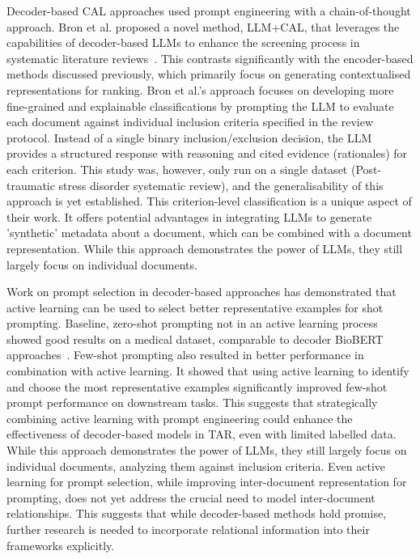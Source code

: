 \documentclass[10pt, english]{article}
\begin{document}
Decoder-based CAL approaches used prompt engineering with a chain-of-thought approach. Bron et al. proposed a novel method, LLM+CAL, that leverages the capabilities of decoder-based LLMs to enhance the screening process in systematic literature reviews~\cite{bron_combining_2024}. This contrasts significantly with the encoder-based methods discussed previously, which primarily focus on generating contextualised representations for ranking. Bron et al.'s approach focuses on developing more fine-grained and explainable classifications by prompting the LLM to evaluate each document against individual inclusion criteria specified in the review protocol. Instead of a single binary inclusion/exclusion decision, the LLM provides a structured response with reasoning and cited evidence (rationales) for each criterion. This study was, however, only run on a single dataset (Post-traumatic stress disorder systematic review), and the generalisability of this approach is yet established. This criterion-level classification is a unique aspect of their work. It offers potential advantages in integrating LLMs to generate 'synthetic' metadata about a document, which can be combined with a document representation. While this approach demonstrates the power of LLMs, they still largely focus on individual documents.

Work on prompt selection in decoder-based approaches has demonstrated that active learning can be used to select better representative examples for shot prompting.  Baseline, zero-shot prompting not in an active learning process showed good results on a medical dataset, comparable to decoder BioBERT approaches~\cite{wang_zero-shot_2024}. Few-shot prompting also resulted in better performance \cite{margatina_importance_2022} in combination with active learning. It showed that using active learning to identify and choose the most representative examples significantly improved few-shot prompt performance on downstream tasks. This suggests that strategically combining active learning with prompt engineering could enhance the effectiveness of decoder-based models in TAR, even with limited labelled data. While this approach demonstrates the power of LLMs, they still largely focus on individual documents, analyzing them against inclusion criteria. Even active learning for prompt selection, while improving inter-document representation for prompting, does not yet address the crucial need to model inter-document relationships.  This suggests that while decoder-based methods hold promise, further research is needed to incorporate relational information into their frameworks explicitly. 
\end{document}
